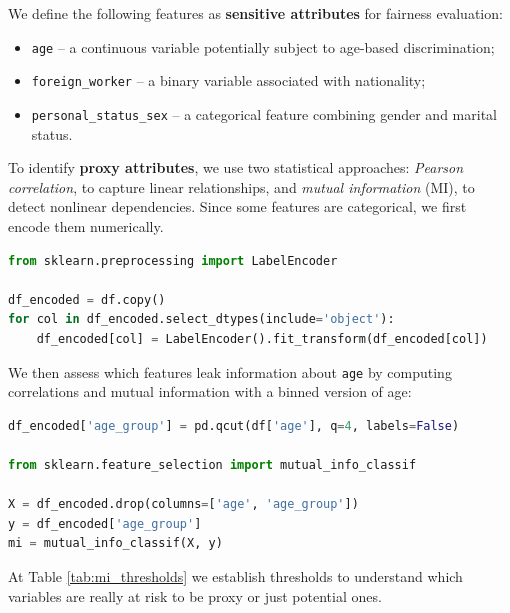 We define the following features as \textbf{sensitive attributes} for fairness evaluation:

\begin{itemize}
    \item \texttt{age} – a continuous variable potentially subject to age-based discrimination;
    \item \texttt{foreign\_worker} – a binary variable associated with nationality;
    \item \texttt{personal\_status\_sex} – a categorical feature combining gender and marital status.
\end{itemize}

To identify \textbf{proxy attributes}, we use two statistical approaches: \textit{Pearson correlation}, to capture linear relationships, and \textit{mutual information} (MI), to detect nonlinear dependencies. Since some features are categorical, we first encode them numerically.

\begin{lstlisting}[language=Python, caption=Encoding categorical features, frame=single]
from sklearn.preprocessing import LabelEncoder

df_encoded = df.copy()
for col in df_encoded.select_dtypes(include='object'):
    df_encoded[col] = LabelEncoder().fit_transform(df_encoded[col])
\end{lstlisting}

We then assess which features leak information about \texttt{age} by computing correlations and mutual information with a binned version of age:

\begin{lstlisting}[language=Python, caption=Analyzing proxy risk for age, frame=single]
df_encoded['age_group'] = pd.qcut(df['age'], q=4, labels=False)

from sklearn.feature_selection import mutual_info_classif

X = df_encoded.drop(columns=['age', 'age_group'])
y = df_encoded['age_group']
mi = mutual_info_classif(X, y)
\end{lstlisting}

At Table \ref{tab:mi_thresholds} we establish thresholds to understand which variables are really at risk to be proxy or just potential ones.

